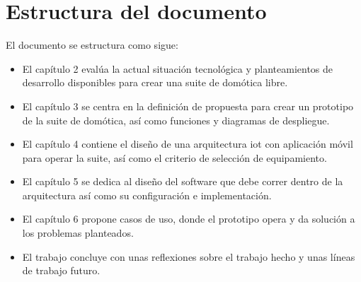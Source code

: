 \section{Estructura del documento}
\label{ch:Capitulo1.3}

El documento se estructura como sigue:

\begin{itemize}
  \item El capítulo 2 evalúa la actual situación tecnológica y planteamientos de desarrollo disponibles para crear una suite de domótica libre.

  \item El capítulo 3 se centra en la definición de propuesta para crear un prototipo de la suite de domótica, así como funciones y diagramas de despliegue.

  \item El capítulo 4 contiene el diseño de una arquitectura \gls{iot} con aplicación móvil para operar la suite, así como el criterio de selección de equipamiento.

  \item El capítulo 5 se dedica al diseño del software que debe correr dentro de la arquitectura así como su configuración e implementación.

  \item El capítulo 6 propone casos de uso, donde el prototipo opera y da solución a los problemas planteados.

  \item El trabajo concluye con unas reflexiones sobre el trabajo hecho y unas líneas de trabajo futuro.
\end{itemize}
